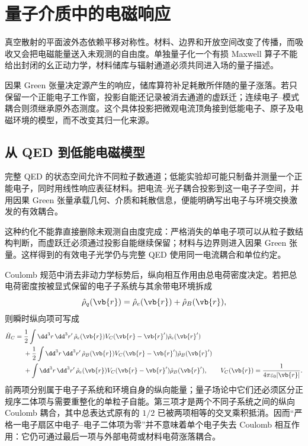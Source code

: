 \chapter{量子介质中的电磁响应}\label{chap:quantum-electromagnetic-media}

真空散射的平面波外态依赖平移对称性。材料、边界和开放空间改变了传播，而吸收又会把电磁能量送入未观测的自由度。单独量子化一个有损 Maxwell 算子不能给出封闭的幺正动力学，材料储库与辐射通道必须共同进入场的量子描述。

因果 Green 张量决定源产生的响应，储库算符补足耗散所伴随的量子涨落。若只保留一个正能电子工作窗，投影自能还记录被消去通道的虚跃迁；连续电子--模式耦合则须继承原外态测度。这个具体投影把微观电流顶角接到低能电子、原子及电磁环境的模型，而不改变其归一化来源。

\section{从 QED 到低能电磁模型}

完整 QED 的状态空间允许不同粒子数通道；低能实验却可能只制备并测量一个正能电子，同时用线性响应表征材料。把电流--光子耦合投影到这一电子子空间，并用因果 Green 张量承载几何、介质和耗散信息，便能明确写出电子与环境交换激发的有效耦合。

这种约化不能靠直接删除未观测自由度完成：严格消失的单电子项可以从粒子数结构判断，而虚跃迁必须通过投影自能继续保留；材料与边界则进入因果 Green 张量。这样得到的有效电子光学仍与完整 QED 使用同一电流耦合和单位约定。

Coulomb 规范中消去非动力学标势后，纵向相互作用由总电荷密度决定。若把总电荷密度按被显式保留的电子子系统与其余带电环境拆成
\[
\hat\rho_q(\vb{r})=\hat\rho_e(\vb{r})+\hat\rho_B(\vb{r}),
\]
则瞬时纵向项可写成
\begin{equation}
{
\begin{aligned}
\hat H_C={}&\frac12\int\dd^3 r\,\dd^3 r'\,
\hat\rho_e(\vb{r})V_C(\vb{r}-\vb{r}')\hat\rho_e(\vb{r}')\\
&+\frac12\int\dd^3 r\,\dd^3 r'\,
\hat\rho_B(\vb{r})V_C(\vb{r}-\vb{r}')\hat\rho_B(\vb{r}')\\
&+\int\dd^3 r\,\dd^3 r'\,
\hat\rho_e(\vb{r})V_C(\vb{r}-\vb{r}')\hat\rho_B(\vb{r}'),
\qquad
V_C(\vb{r})=\frac{1}{4\pi\varepsilon_0|\vb{r}|}.
\end{aligned}}
\label{eq:coulomb-subsystem-decomposition-dp75}
\end{equation}
前两项分别属于电子子系统和环境自身的纵向能量；量子场论中它们还必须区分正规序二体项与需要重整化的单粒子自能。第三项才是两个不同子系统之间的纵向 Coulomb 耦合，其中总表达式原有的 $1/2$ 已被两项相等的交叉乘积抵消。因而“严格一电子扇区中电子--电子二体项为零”并不意味着单个电子失去 Coulomb 相互作用：它仍可通过最后一项与外部电荷或材料电荷涨落耦合。

